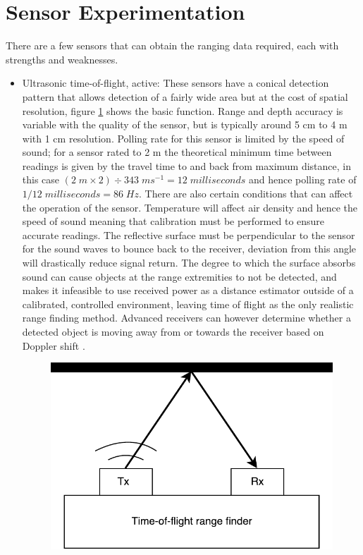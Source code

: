 \section{Sensor Experimentation}
\label{sec:sensorexperimentation}
There are a few sensors that can obtain the ranging data required, each with strengths and weaknesses.\par
\begin{itemize}
\item Ultrasonic time-of-flight, active: These sensors have a conical detection pattern that allows detection of a fairly wide area but at the cost of spatial resolution, figure \ref{fig:ultrasonicdiagram} shows the basic function. Range and depth accuracy is variable with the quality of the sensor, but is typically around 5 cm to 4 m with 1 cm resolution. Polling rate for this sensor is limited  by the speed of sound; for a sensor rated to 2 m the theoretical minimum time between readings is given by the travel time to and back from maximum distance, in this case \((2\; m \times 2) \div 343\; ms^{-1} = 12\; milliseconds\) and hence polling rate of \(1/12\; milliseconds = 86\; Hz\). There are also certain conditions that can affect the operation of the sensor. Temperature will affect air density and hence the speed of sound meaning that calibration must be performed to ensure accurate readings. The reflective surface must be perpendicular to the sensor for the sound waves to bounce back to the receiver, deviation from this angle will drastically reduce signal return. The degree to which the surface absorbs sound can cause objects at the range extremities to not be detected, and makes it infeasible to use received power as a distance estimator outside of a calibrated, controlled environment, leaving time of flight as the only realistic range finding method. Advanced receivers can however determine whether a detected object is moving away from or towards the receiver based on Doppler shift \cite{petrescu2012new}.


\begin{figure}[h]
	\centering
	\includegraphics[height=0.25\textheight]{ultrasonic.pdf}
	\label{fig:ultrasonicdiagram}
\end{figure}


\end{itemize}
